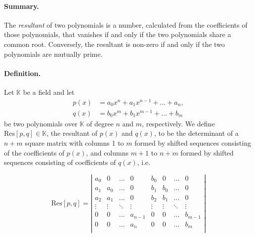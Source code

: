 \documentclass[12pt]{article}
\newcommand{\kfield}{\mathbb{K}}
\newcommand{\Res}{\mathrm{Res}}
\begin{document}
\paragraph{Summary.}
The {\em resultant} of two polynomials is a number, calculated from
the coefficients of those polynomials, that vanishes if and only if
the two polynomials share a common root.  Conversely, the resultant is
non-zero if and only if the two polynomials are mutually prime.

\paragraph{Definition.}
Let $\kfield$ be a field and let
\begin{align*}
p(x) &= a_0 x^n + a_1 x^{n-1} + \ldots + a_n,\\
q(x) &= b_0 x^m + b_1 x^{m-1} + \ldots + b_m  
\end{align*}
be two polynomials over $\kfield$ of degree $n$ and $m$, respectively.
We define $\Res[p,q]\in\kfield$, the resultant of $p(x)$ and $q(x)$,
to be the determinant of a $n+m$ square matrix with columns 1 to $m$
formed by shifted sequences consisting of the coefficients of $p(x)$,
and columns $m+1$ to $n+m$ formed by shifted sequences consisting of
coefficients of $q(x)$, i.e.

$$\Res[p,q] = \left | 
  \begin{array}{cccccccc}
    a_0 & 0 &  \ldots &  0 & b_0 & 0 & \ldots & 0 \\
    a_1 & a_0  & \ldots & 0 & b_1 & b_0 & \ldots & 0 \\
    a_2 & a_1 & \ldots  & 0 & b_2 & b_1 & \ldots & 0\\
    \vdots & \vdots  & \ddots & \vdots  &\vdots  &\vdots 
    &\ddots & \vdots \\
    0 & 0 &  \ldots  & a_{n-1} & 0 & 0 &\ldots & b_{m-1} \\
    0 & 0 &  \ldots  & a_n & 0 & 0 &\ldots & b_m \\
  \end{array}
\right|
$$
\end{document}
